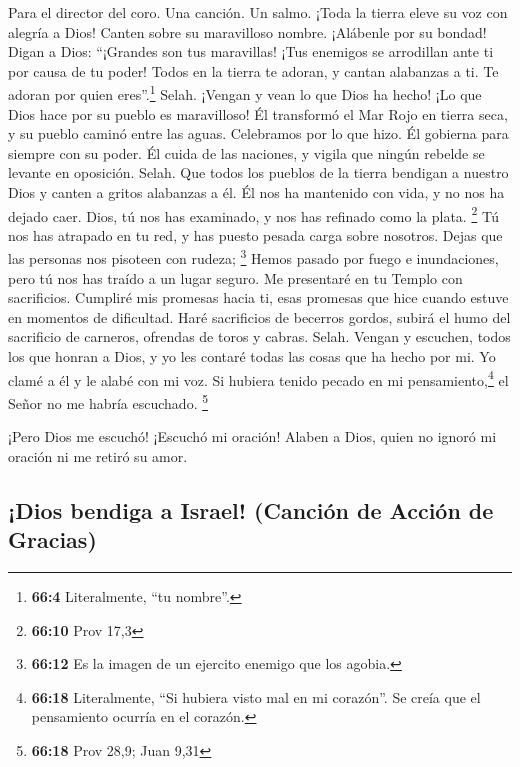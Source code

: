 Para el director del coro. Una canción. Un salmo.  ¡Toda
la tierra eleve su voz con alegría a Dios!  Canten sobre
su maravilloso nombre. ¡Alábenle por su bondad!  Digan a
Dios: ``¡Grandes son tus maravillas! ¡Tus enemigos se arrodillan ante ti
por causa de tu poder!  Todos en la tierra te adoran, y
cantan alabanzas a ti. Te adoran por quien eres''.\footnote{\textbf{66:4}
  Literalmente, ``tu nombre''.} Selah.  ¡Vengan y vean lo
que Dios ha hecho! ¡Lo que Dios hace por su pueblo es maravilloso!
 Él transformó el Mar Rojo en tierra seca, y su pueblo
caminó entre las aguas. Celebramos por lo que hizo.  Él
gobierna para siempre con su poder. Él cuida de las naciones, y vigila
que ningún rebelde se levante en oposición. Selah.  Que
todos los pueblos de la tierra bendigan a nuestro Dios y canten a gritos
alabanzas a él.  Él nos ha mantenido con vida, y no nos ha
dejado caer.  Dios, tú nos has examinado, y nos has
refinado como la plata. \footnote{\textbf{66:10} Prov 17,3}
 Tú nos has atrapado en tu red, y has puesto pesada carga
sobre nosotros.  Dejas que las personas nos pisoteen con
rudeza; \footnote{\textbf{66:12} Es la imagen de un ejercito enemigo que
  los agobia.} Hemos pasado por fuego e inundaciones, pero tú nos has
traído a un lugar seguro.  Me presentaré en tu Templo con
sacrificios. Cumpliré mis promesas hacia ti,  esas
promesas que hice cuando estuve en momentos de dificultad.
 Haré sacrificios de becerros gordos, subirá el humo del
sacrificio de carneros, ofrendas de toros y cabras. Selah.
 Vengan y escuchen, todos los que honran a Dios, y yo les
contaré todas las cosas que ha hecho por mi.  Yo clamé a
él y le alabé con mi voz.  Si hubiera tenido pecado en mi
pensamiento,\footnote{\textbf{66:18} Literalmente, ``Si hubiera visto
  mal en mi corazón''. Se creía que el pensamiento ocurría en el
  corazón.} el Señor no me habría escuchado. \footnote{\textbf{66:18}
  Prov 28,9; Juan 9,31}

 ¡Pero Dios me escuchó! ¡Escuchó mi oración!
 Alaben a Dios, quien no ignoró mi oración ni me retiró
su amor.

\hypertarget{dios-bendiga-a-israel-canciuxf3n-de-acciuxf3n-de-gracias}{%
\subsection{¡Dios bendiga a Israel! (Canción de Acción de
Gracias)}\label{dios-bendiga-a-israel-canciuxf3n-de-acciuxf3n-de-gracias}}

